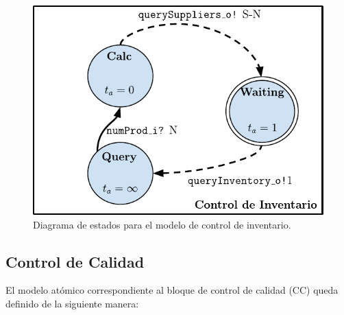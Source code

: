 \documentclass[10pt]{article}
\begin{document}
\begin{figure}[htbp]
	\centering
	\includegraphics{img/controlInventariodevsgraph}
	\caption{Diagrama de estados para el modelo de control de inventario.}
	\label{fig:CI-estados}
\end{figure}

\subsection{Control de Calidad\label{sec:CC}}
El modelo atómico correspondiente al bloque de control de calidad (CC) queda definido de la siguiente manera:
\end{document}
